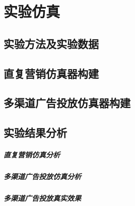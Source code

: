 \chapter{实验仿真}

\section{实验方法及实验数据}
\section{直复营销仿真器构建}
\section{多渠道广告投放仿真器构建}
\section{实验结果分析}
\paragraph{直复营销仿真分析}
\paragraph{多渠道广告投放仿真分析}
\paragraph{多渠道广告投放真实效果}
 